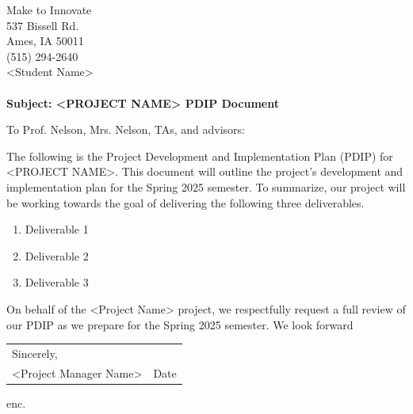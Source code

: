 
\newcommand{\mytitle}{M2I Project Development and Implementation Plan (PDIP)}
\newcommand{\myauthors}{Project Manager Name}
\newcommand{\mydate}{\today \\ Revision 1.0}





    {Make to Innovate\\537 Bissell Rd.\\Ames, IA 50011\\(515) 294-2640} %
    \\ {<Student Name>}                             %
    \\ \\ \textbf{Subject: {<PROJECT NAME> PDIP Document}}                              %

To Prof. Nelson, Mrs. Nelson, TAs, and advisors:

The following is the Project Development and Implementation Plan (PDIP) for <PROJECT NAME>. This document will outline the project's development and implementation plan for the Spring 2025 semester. To summarize, our project will be working towards the goal of delivering the following three deliverables.

\begin{enumerate}
    \item Deliverable 1
    \item Deliverable 2
    \item Deliverable 3
\end{enumerate}

On behalf of the <Project Name> project, we respectfully request a full review of our PDIP as we prepare for the Spring 2025 semester. We look forward 

\begin{flushright}
    \begin{tabularx}{0.5\textwidth}{l l @{}}
        Sincerely, & \\
        \signature{4}{<Project Manager Name>} & \signature{3.2}{Date}\\
    \end{tabularx}
\end{flushright}
enc.
\hfuzz=0pt

